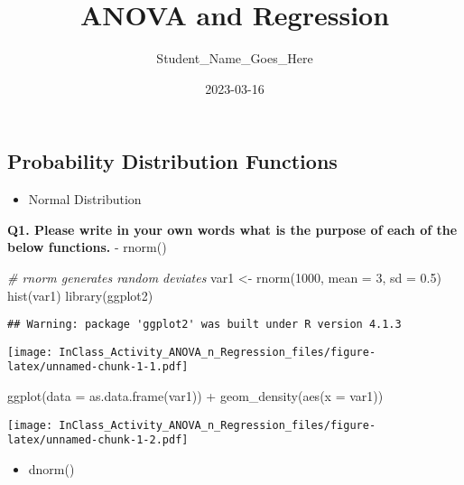\documentclass[
]{article}
\title{ANOVA and Regression}
\author{Student\_Name\_Goes\_Here}
\date{2023-03-16}
\newenvironment{Shaded}{\begin{snugshade}}{\end{snugshade}}
\newcommand{\AttributeTok}[1]{\textcolor[rgb]{0.77,0.63,0.00}{#1}}
\newcommand{\CommentTok}[1]{\textcolor[rgb]{0.56,0.35,0.01}{\textit{#1}}}
\newcommand{\DecValTok}[1]{\textcolor[rgb]{0.00,0.00,0.81}{#1}}
\newcommand{\FloatTok}[1]{\textcolor[rgb]{0.00,0.00,0.81}{#1}}
\newcommand{\FunctionTok}[1]{\textcolor[rgb]{0.00,0.00,0.00}{#1}}
\newcommand{\NormalTok}[1]{#1}
\newcommand{\OtherTok}[1]{\textcolor[rgb]{0.56,0.35,0.01}{#1}}
\newcommand{\SpecialCharTok}[1]{\textcolor[rgb]{0.00,0.00,0.00}{#1}}
\providecommand{\tightlist}{%
  \setlength{\itemsep}{0pt}\setlength{\parskip}{0pt}}
\begin{document}
\maketitle

\hypertarget{probability-distribution-functions}{%
\subsection{Probability Distribution
Functions}\label{probability-distribution-functions}}

\begin{itemize}
\tightlist
\item
  Normal Distribution
\end{itemize}

\textbf{Q1. Please write in your own words what is the purpose of each
of the below functions. } - rnorm()

\begin{Shaded}
\begin{Highlighting}[]
\CommentTok{\# rnorm generates random deviates }
\NormalTok{var1 }\OtherTok{\textless{}{-}} \FunctionTok{rnorm}\NormalTok{(}\DecValTok{1000}\NormalTok{, }\AttributeTok{mean =} \DecValTok{3}\NormalTok{, }\AttributeTok{sd =} \FloatTok{0.5}\NormalTok{)}
\FunctionTok{hist}\NormalTok{(var1)}
\FunctionTok{library}\NormalTok{(ggplot2)}
\end{Highlighting}
\end{Shaded}

\begin{verbatim}
## Warning: package 'ggplot2' was built under R version 4.1.3
\end{verbatim}

\texttt{[image: InClass\_Activity\_ANOVA\_n\_Regression\_files/figure-latex/unnamed-chunk-1-1.pdf]}

\begin{Shaded}
\begin{Highlighting}[]
\FunctionTok{ggplot}\NormalTok{(}\AttributeTok{data =} \FunctionTok{as.data.frame}\NormalTok{(var1)) }\SpecialCharTok{+}
  \FunctionTok{geom\_density}\NormalTok{(}\FunctionTok{aes}\NormalTok{(}\AttributeTok{x =}\NormalTok{ var1))}
\end{Highlighting}
\end{Shaded}

\texttt{[image: InClass\_Activity\_ANOVA\_n\_Regression\_files/figure-latex/unnamed-chunk-1-2.pdf]}

\begin{itemize}
\tightlist
\item
  dnorm()
\end{itemize}
\end{document}

